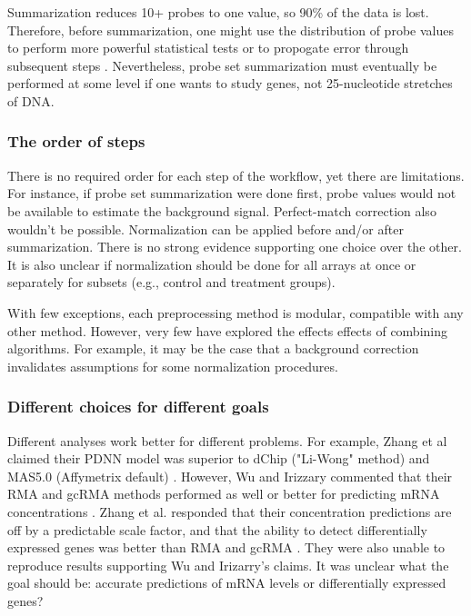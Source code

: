 Summarization reduces 10+ probes to one value, so 90\% of the data
is lost. Therefore, before summarization, one might use
the distribution of probe values to perform more powerful statistical tests or to propogate
error through subsequent steps \cite{Milo:2003tt,Liu:2005ey}.
Nevertheless, probe set summarization must eventually be performed
at some level if one wants to study genes, not 25-nucleotide stretches of DNA.

\subsubsection{The order of steps}
There is no required order for each step of the workflow,
yet there are limitations. For instance, if probe set summarization were done first,
probe values would not be available to estimate the background signal. 
Perfect-match correction also wouldn't
be possible. Normalization can be applied before and/or after summarization.
There is no strong evidence supporting one choice over the other.
It is also unclear if normalization should be done for all arrays at once
or separately for subsets (e.g., control and treatment groups).

With few exceptions, each preprocessing method is modular, compatible
with any other method. However, very few have explored
the effects effects of combining algorithms.
For example, it may be the case that a background correction
invalidates assumptions for some normalization procedures.

\subsubsection{Different choices for different goals}\label{introjtm:difgoals}

Different analyses work better for different problems.
For example, Zhang et al claimed their PDNN model 
was superior to dChip ("Li-Wong" method)
and MAS5.0 (Affymetrix default) \cite{Zhang:2003to}.
However, Wu and Irizzary commented that their
RMA and gcRMA methods performed as well or better for predicting
mRNA concentrations \cite{Wu:2004ul}.
Zhang et al. responded that their concentration predictions
are off by a predictable scale factor, and that
the ability to detect differentially expressed genes
was better than RMA and gcRMA \cite{Zhang:2004tl}. They were also unable to
reproduce results supporting Wu and Irizarry's claims.
It was unclear what the goal should be: accurate predictions of mRNA levels or
differentially expressed genes?

